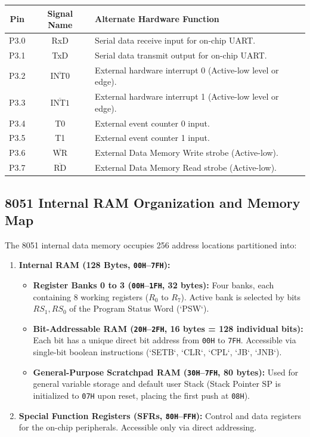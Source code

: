 \documentclass[12pt,a4paper]{article}
\begin{document}
\begin{tcolorbox}[formulabox, title={Port 3 Multifunctional Alternate Assignments}]
\centering
\begin{tabular}{|c|c|l|}
\hline
\textbf{Pin} & \textbf{Signal Name} & \textbf{Alternate Hardware Function} \\ \hline
P3.0 & RxD & Serial data receive input for on-chip UART. \\ \hline
P3.1 & TxD & Serial data transmit output for on-chip UART. \\ \hline
P3.2 & $\overline{\mathrm{INT0}}$ & External hardware interrupt 0 (Active-low level or edge). \\ \hline
P3.3 & $\overline{\mathrm{INT1}}$ & External hardware interrupt 1 (Active-low level or edge). \\ \hline
P3.4 & T0 & External event counter 0 input. \\ \hline
P3.5 & T1 & External event counter 1 input. \\ \hline
P3.6 & $\overline{\mathrm{WR}}$ & External Data Memory Write strobe (Active-low). \\ \hline
P3.7 & $\overline{\mathrm{RD}}$ & External Data Memory Read strobe (Active-low). \\ \hline
\end{tabular}
\end{tcolorbox}

\subsection{8051 Internal RAM Organization and Memory Map}
The 8051 internal data memory occupies 256 address locations partitioned into:
\begin{enumerate}[leftmargin=*]
  \item \textbf{Internal RAM (128 Bytes, \texttt{00H}--\texttt{7FH}):}
  \begin{itemize}[leftmargin=*]
    \item \textbf{Register Banks 0 to 3 (\texttt{00H}--\texttt{1FH}, 32 bytes):} Four banks, each containing 8 working registers ($R_0$ to $R_7$). Active bank is selected by bits $RS_1, RS_0$ of the Program Status Word (`PSW`).
    \item \textbf{Bit-Addressable RAM (\texttt{20H}--\texttt{2FH}, 16 bytes = 128 individual bits):} Each bit has a unique direct bit address from \texttt{00H} to \texttt{7FH}. Accessible via single-bit boolean instructions (`SETB`, `CLR`, `CPL`, `JB`, `JNB`).
    \item \textbf{General-Purpose Scratchpad RAM (\texttt{30H}--\texttt{7FH}, 80 bytes):} Used for general variable storage and default user Stack (Stack Pointer $\mathrm{SP}$ is initialized to \texttt{07H} upon reset, placing the first push at \texttt{08H}).
  \end{itemize}
  \item \textbf{Special Function Registers (SFRs, \texttt{80H}--\texttt{FFH}):} Control and data registers for the on-chip peripherals. Accessible only via direct addressing.
\end{enumerate}
\end{document}
